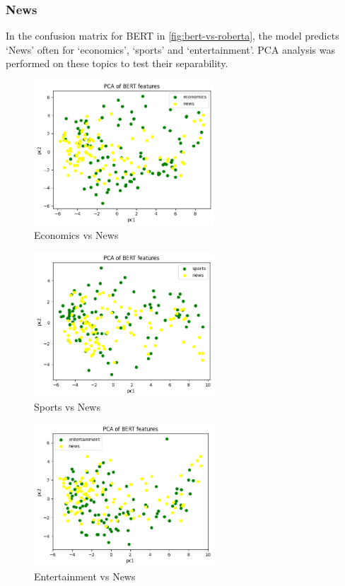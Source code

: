 \subsubsection{News}
In the confusion matrix for BERT in \cref{fig:bert-vs-roberta}, the model predicts `News' often for `economics', `sports' and `entertainment'.
PCA analysis was performed on these topics to test their separability.
\begin{figure}[hbtp]
    \centering
    \includegraphics[width=0.6\textwidth]{../images/econ-news.png}
    \caption{Economics vs News}
    \label{fig:econ-news}
\end{figure} 
\begin{figure}[hbtp]
    \centering
    \includegraphics[width=0.6\textwidth]{../images/sport-news.png}
    \caption{Sports vs News}
    \label{fig:sport-news}
\end{figure} 
\begin{figure}[hbtp]
    \centering
    \includegraphics[width=0.6\textwidth]{../images/ent-news.png}
    \caption{Entertainment vs News}
    \label{fig:ent-news}
\end{figure} 


